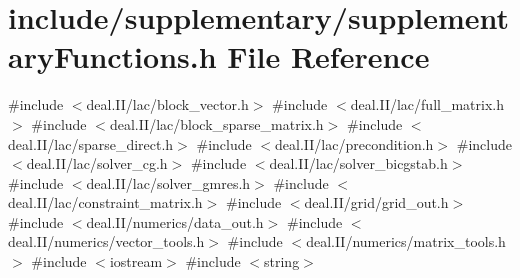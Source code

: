 \section{include/supplementary/supplementary\+Functions.h File Reference}
\label{supplementary_functions_8h}
{\ttfamily \#include $<$deal.\+I\+I/lac/block\+\_\+vector.\+h$>$}\newline
{\ttfamily \#include $<$deal.\+I\+I/lac/full\+\_\+matrix.\+h$>$}\newline
{\ttfamily \#include $<$deal.\+I\+I/lac/block\+\_\+sparse\+\_\+matrix.\+h$>$}\newline
{\ttfamily \#include $<$deal.\+I\+I/lac/sparse\+\_\+direct.\+h$>$}\newline
{\ttfamily \#include $<$deal.\+I\+I/lac/precondition.\+h$>$}\newline
{\ttfamily \#include $<$deal.\+I\+I/lac/solver\+\_\+cg.\+h$>$}\newline
{\ttfamily \#include $<$deal.\+I\+I/lac/solver\+\_\+bicgstab.\+h$>$}\newline
{\ttfamily \#include $<$deal.\+I\+I/lac/solver\+\_\+gmres.\+h$>$}\newline
{\ttfamily \#include $<$deal.\+I\+I/lac/constraint\+\_\+matrix.\+h$>$}\newline
{\ttfamily \#include $<$deal.\+I\+I/grid/grid\+\_\+out.\+h$>$}\newline
{\ttfamily \#include $<$deal.\+I\+I/numerics/data\+\_\+out.\+h$>$}\newline
{\ttfamily \#include $<$deal.\+I\+I/numerics/vector\+\_\+tools.\+h$>$}\newline
{\ttfamily \#include $<$deal.\+I\+I/numerics/matrix\+\_\+tools.\+h$>$}\newline
{\ttfamily \#include $<$iostream$>$}\newline
{\ttfamily \#include $<$string$>$}\newline
